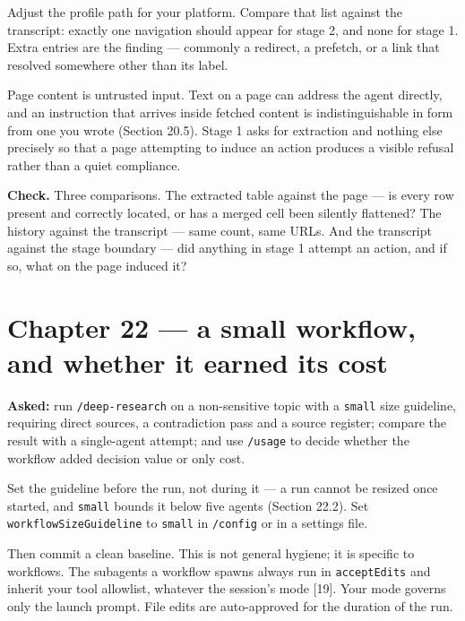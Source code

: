 \documentclass[11pt,a4paper,twoside,openany]{book}
\begin{document}
Adjust the profile path for your platform. Compare that list against the transcript: exactly one navigation should appear for stage 2, and none for stage 1. Extra entries are the finding — commonly a redirect, a prefetch, or a link that resolved somewhere other than its label.


Page content is untrusted input. Text on a page can address the agent directly, and an instruction that arrives inside fetched content is indistinguishable in form from one you wrote (Section 20.5). Stage 1 asks for extraction and nothing else precisely so that a page attempting to induce an action produces a visible refusal rather than a quiet compliance.


\textbf{Check.} Three comparisons. The extracted table against the page — is every row present and correctly located, or has a merged cell been silently flattened? The history against the transcript — same count, same URLs. And the transcript against the stage boundary — did anything in stage 1 attempt an action, and if so, what on the page induced it?


\FloatBarrier
\section*{Chapter 22 — a small workflow, and whether it earned its cost}

\textbf{Asked:} run \texttt{/\allowbreak{}deep-\allowbreak{}research} on a non-sensitive topic with a \texttt{small} size guideline, requiring direct sources, a contradiction pass and a source register; compare the result with a single-agent attempt; and use \texttt{/\allowbreak{}usage} to decide whether the workflow added decision value or only cost.


Set the guideline before the run, not during it — a run cannot be resized once started, and \texttt{small} bounds it below five agents (Section 22.2). Set \texttt{workflow\allowbreak{}Size\allowbreak{}Guideline} to \texttt{small} in \texttt{/\allowbreak{}config} or in a settings file.


Then commit a clean baseline. This is not general hygiene; it is specific to workflows. The subagents a workflow spawns always run in \texttt{accept\allowbreak{}Edits} and inherit your tool allowlist, whatever the session's mode [19]. Your mode governs only the launch prompt. File edits are auto-approved for the duration of the run.
\end{document}
